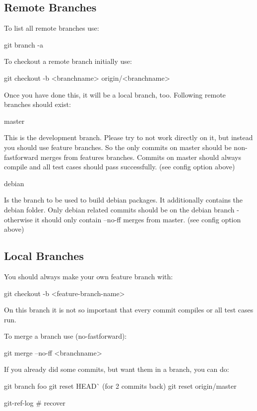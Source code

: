 \subsection*{Remote Branches}

To list all remote branches use\+: \begin{DoxyVerb}git branch -a
\end{DoxyVerb}


To checkout a remote branch initially use\+: \begin{DoxyVerb}git checkout -b <branchname> origin/<branchname>
\end{DoxyVerb}


Once you have done this, it will be a local branch, too. Following remote branches should exist\+: \begin{DoxyVerb}master
\end{DoxyVerb}


This is the development branch. Please try to not work directly on it, but instead you should use feature branches. So the only commits on master should be non-\/fastforward merges from features branches. Commits on master should always compile and all test cases should pass successfully. (see config option above) \begin{DoxyVerb}debian
\end{DoxyVerb}


Is the branch to be used to build debian packages. It additionally contains the debian folder. Only debian related commits should be on the debian branch -\/ otherwise it should only contain --no-\/ff merges from master. (see config option above)

\subsection*{Local Branches}

You should always make your own feature branch with\+: \begin{DoxyVerb}git checkout -b <feature-branch-name>
\end{DoxyVerb}


On this branch it is not so important that every commit compiles or all test cases run.

To merge a branch use (no-\/fastforward)\+: \begin{DoxyVerb}git merge --no-ff <branchname>
\end{DoxyVerb}


If you already did some commits, but want them in a branch, you can do\+: \begin{DoxyVerb}git branch foo
git reset HEAD^^  (for 2 commits back)
git reset origin/master

git-ref-log # recover\end{DoxyVerb}
 